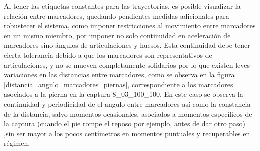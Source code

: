 Al tener las etiquetas constantes para las trayectorias, es posible visualizar la relación entre marcadores, quedando pendientes medidas adicionales para robustecer el sistema, como imponer restricciones al movimiento entre marcadores en un mismo miembro, por imponer no solo continuidad en aceleración de marcadores sino ángulos de articulaciones y huesos. Esta continuidad debe tener cierta tolerancia debido a que los marcadores son representativos de articulaciones, y no se mueven completamente solidarios por lo que existen leves variaciones en las distancias entre marcadores, como se observa en la figura \ref{distancia_angulo_marcadores_piernas}, correspondiente a los marcadores asociados a la pierna en la captura 8\_03\_100\_100. En este caso se observa la continuidad y periodicidad de el angulo entre marcadores así como la constancia de la distancia, salvo momentos ocasionales, asociados a momentos específicos de la captura (cuando el pie rompe el reposo por ejemplo, antes de dar otro paso) ,sin ser mayor a los pocos centímetros en momentos puntuales y recuperables en régimen.

